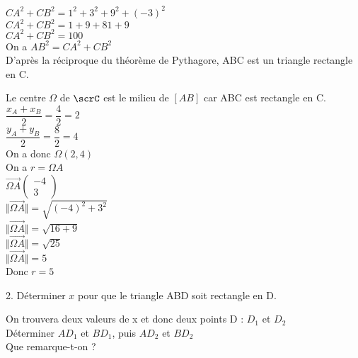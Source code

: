 $ CA^2 + CB^2 = 1^2 + 3^2 + 9^2 + \left(-3\right)^2 $\\

$ CA^2 + CB^2 = 1 + 9 + 81 + 9 $\\

$ CA^2 + CB^2 = 100 $\\

On a $ AB^2 = CA^2 + CB^2 $\\

D'après la réciproque du théorème de Pythagore, ABC est un triangle rectangle en C.

Le centre $\Omega$ de $\scrC$ est le milieu de $\left[AB\right]$ car ABC est rectangle en C.\\

$\dfrac{x_A + x_B}{2} = \dfrac{4}{2} = 2$\\

$ \dfrac{y_A + y_B}{2} = \dfrac{8}{2} = 4$\\

On a donc $\Omega \left(2,4\right)$\\

On a $r = \Omega A$\\

$\overrightarrow{\Omega A}\left(\begin{array}{c} -4\\ 3 \end{array}\right)$\\

$\Vert \overrightarrow{\Omega A} \Vert = \sqrt{\left(-4\right)^2 + 3^2} $\\

$\Vert \overrightarrow{\Omega A} \Vert = \sqrt{16 + 9} $\\

$\Vert \overrightarrow{\Omega A} \Vert = \sqrt{25}$\\

$\Vert \overrightarrow{\Omega A} \Vert = 5 $\\

Donc $r=5$


\newpage


2. Déterminer $x$ pour que le triangle ABD soit rectangle en D.

On trouvera deux valeurs de x et donc deux points D : $D_1$ et $D_2$\\

Déterminer $AD_1$ et $BD_1$, puis $AD_2$ et $BD_2$\\

Que remarque-t-on ?\\

